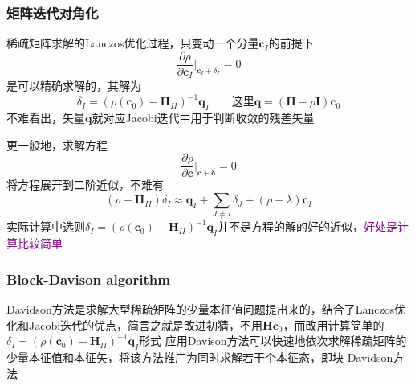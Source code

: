 \frame
{
	\frametitle{矩阵迭代对角化}
	稀疏矩阵求解的\textrm{Lanczos}优化过程，只变动一个分量$\mathbf{c}_I$的前提下
	\begin{displaymath}
		\dfrac{\partial\rho}{\partial\mathbf{c}_I}\bigg|_{\mathbf{c}_I+\delta_I}=0
	\end{displaymath}
	是可以精确求解的，其解为
	\begin{displaymath}
		\delta_I=(\rho(\mathbf{c}_0)-\mathbf{H}_{II})^{-1}\mathbf{q}_I\qquad\mbox{这里}\mathbf{q}=(\mathbf{H}-\rho\mathbf{I})\mathbf{c}_0
	\end{displaymath}
	不难看出，矢量$\mathbf{q}$就对应\textrm{Jacobi}迭代中用于判断收敛的残差矢量

更一般地，求解方程
	\begin{displaymath}
		\dfrac{\partial\rho}{\partial\mathbf{c}}\bigg|_{\mathbf{c}+\mathbf{\delta}}=0
	\end{displaymath}
	将方程展开到二阶近似，不难有
	\begin{displaymath}
		(\rho-\mathbf{H}_{II})\delta_I\approx \mathbf{q}_I+\sum_{J\neq I}\delta_J+(\rho-\lambda)\mathbf{c}_I
	\end{displaymath}
	实际计算中选则$\delta_I=(\rho(\mathbf{c}_0)-\mathbf{H}_{II})^{-1}\mathbf{q}_I$并不是方程的解的好的近似，\textcolor{purple}{好处是计算比较简单}
}

\frame
{
	\frametitle{\textrm{Block-Davison algorithm}}
	\textrm{Davidson}方法是求解大型稀疏矩阵的少量本征值问题提出来的，结合了\textrm{Lanczos}优化和\textrm{Jacobi}迭代的优点，简言之就是改进初猜，不用$\mathbf{H}\mathbf{c}_0$，而改用计算简单的$\delta_I=(\rho(\mathbf{c}_0)-\mathbf{H}_{II})^{-1}\mathbf{q}_I$形式
	\vskip 10pt
	应用\textrm{Davison}方法可以快速地依次求解稀疏矩阵的少量本征值和本征矢，将该方法推广为同时求解若干个本征态，即块-\textrm{Davidson}方法
	{\fontsize{6.2pt}{1.2pt}}
}

